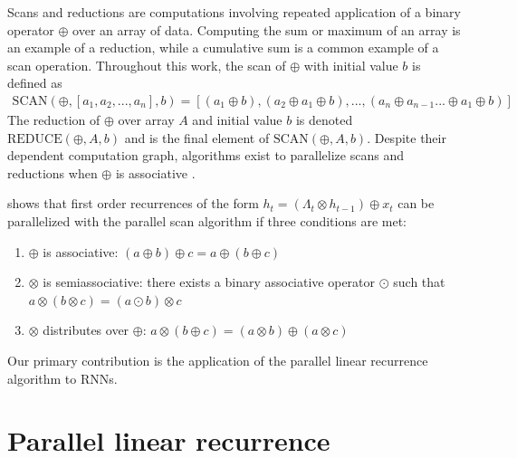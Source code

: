 \documentclass{article}
\providecommand{\scan}{\text{SCAN}}
\providecommand{\reduce}{\text{REDUCE}}
\begin{document}
Scans and reductions are computations involving repeated application of a binary
operator $\oplus$ over an array of data. Computing the sum or maximum
of an array is an example of a reduction, while a cumulative sum is a common
example of a scan operation. Throughout this work, the scan of $\oplus$ with
initial value $b$ is defined as
\begin{align*}
\scan(\oplus, [a_1, a_2, ..., a_n], b) = [(a_1 \oplus b), (a_2 \oplus a_1 \oplus b), ..., (a_n \oplus a_{n-1} ... \oplus a_1 \oplus b)]
\end{align*}
The reduction of $\oplus$ over array $A$ and initial value $b$ is denoted 
$\reduce(\oplus, A, b)$ and is the final element of $\scan(\oplus, A, b)$.
Despite their dependent computation graph, algorithms exist to parallelize scans 
and reductions when $\oplus$ is associative \cite{ladner1980parallel}.

\citet{blelloch1990prefix} shows that first order recurrences of the form
$h_t = (\Lambda_t \otimes h_{t-1}) \oplus x_t$ can be parallelized with
the parallel scan algorithm if three conditions are met:

\begin{enumerate}
\item $\oplus$ is associative: $(a \oplus b) \oplus c = a \oplus (b \oplus c)$
\item $\otimes$ is semiassociative: there exists a binary associative operator
$\odot$ such that $a \otimes (b \otimes c) = (a \odot b) \otimes c$
\item $\otimes$ distributes over $\oplus$: $a\otimes(b\oplus c) = (a\otimes b) \oplus (a \otimes c)$ 
\end{enumerate}

Our primary contribution is the application of the parallel linear recurrence algorithm to RNNs.

\section{Parallel linear recurrence}
\end{document}
